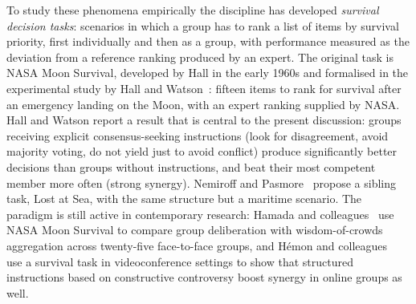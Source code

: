 To study these phenomena empirically the discipline has developed \emph{survival decision tasks}: scenarios in which a group has to rank a list of items by survival priority, first individually and then as a group, with performance measured as the deviation from a reference ranking produced by an expert. The original task is NASA Moon Survival, developed by Hall in the early 1960s and formalised in the experimental study by Hall and Watson~\cite{hall1970normative}: fifteen items to rank for survival after an emergency landing on the Moon, with an expert ranking supplied by NASA. Hall and Watson report a result that is central to the present discussion: groups receiving explicit consensus-seeking instructions (look for disagreement, avoid majority voting, do not yield just to avoid conflict) produce significantly better decisions than groups without instructions, and beat their most competent member more often (strong synergy). Nemiroff and Pasmore~\cite{nemiroff1975lostatsea} propose a sibling task, Lost at Sea, with the same structure but a maritime scenario. The paradigm is still active in contemporary research: Hamada and colleagues~\cite{hamada2020wisdom} use NASA Moon Survival to compare group deliberation with wisdom-of-crowds aggregation across twenty-five face-to-face groups, and Hémon and colleagues~\cite{hemon2024constructive} use a survival task in videoconference settings to show that structured instructions based on constructive controversy boost synergy in online groups as well.
